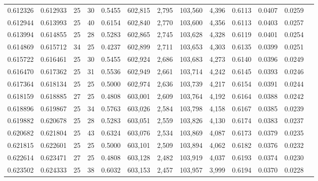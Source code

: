 \begin{tabular}{rrrrrrrrrrrrr}
0.612326 & 0.612933 &    25 &  30 &                                     0.5455 & 602,815 &   2,795 & 103,560 &   4,396 & 0.6113 & 0.0407 & 0.0259 \\
0.612944 & 0.613993 &    25 &  40 &                                     0.6154 & 602,840 &   2,770 & 103,600 &   4,356 & 0.6113 & 0.0403 & 0.0257 \\
0.613994 & 0.614855 &    25 &  28 &                                     0.5283 & 602,865 &   2,745 & 103,628 &   4,328 & 0.6119 & 0.0401 & 0.0254 \\
0.614869 & 0.615712 &    34 &  25 &                                     0.4237 & 602,899 &   2,711 & 103,653 &   4,303 & 0.6135 & 0.0399 & 0.0251 \\
0.615722 & 0.616461 &    25 &  30 &                                     0.5455 & 602,924 &   2,686 & 103,683 &   4,273 & 0.6140 & 0.0396 & 0.0249 \\
0.616470 & 0.617362 &    25 &  31 &                                     0.5536 & 602,949 &   2,661 & 103,714 &   4,242 & 0.6145 & 0.0393 & 0.0246 \\
0.617364 & 0.618134 &    25 &  25 &                                     0.5000 & 602,974 &   2,636 & 103,739 &   4,217 & 0.6154 & 0.0391 & 0.0244 \\
0.618159 & 0.618885 &    27 &  25 &                                     0.4808 & 603,001 &   2,609 & 103,764 &   4,192 & 0.6164 & 0.0388 & 0.0242 \\
0.618896 & 0.619867 &    25 &  34 &                                     0.5763 & 603,026 &   2,584 & 103,798 &   4,158 & 0.6167 & 0.0385 & 0.0239 \\
0.619882 & 0.620678 &    25 &  28 &                                     0.5283 & 603,051 &   2,559 & 103,826 &   4,130 & 0.6174 & 0.0383 & 0.0237 \\
0.620682 & 0.621804 &    25 &  43 &                                     0.6324 & 603,076 &   2,534 & 103,869 &   4,087 & 0.6173 & 0.0379 & 0.0235 \\
0.621815 & 0.622601 &    25 &  25 &                                     0.5000 & 603,101 &   2,509 & 103,894 &   4,062 & 0.6182 & 0.0376 & 0.0232 \\
0.622614 & 0.623471 &    27 &  25 &                                     0.4808 & 603,128 &   2,482 & 103,919 &   4,037 & 0.6193 & 0.0374 & 0.0230 \\
0.623502 & 0.624333 &    25 &  38 &                                     0.6032 & 603,153 &   2,457 & 103,957 &   3,999 & 0.6194 & 0.0370 & 0.0228 \\

\end{tabular}
